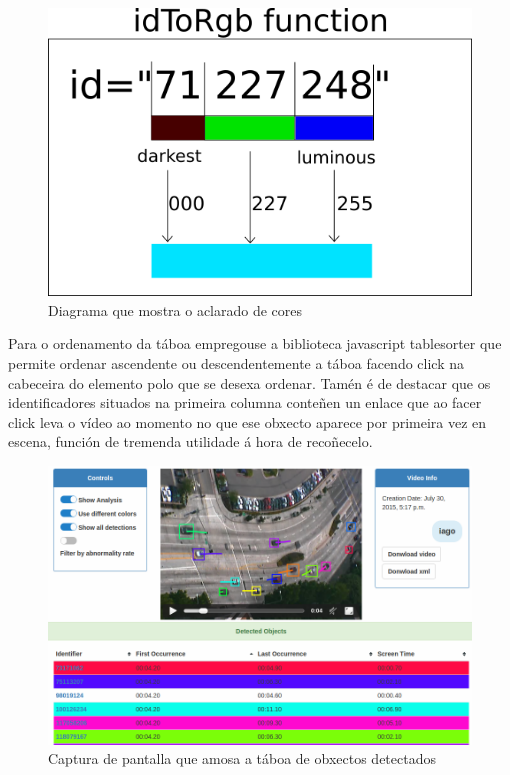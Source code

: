     \begin{figure}[htp]
    \begin{center}
        \includegraphics[scale=0.7]{figures/lightColor.png}
        \caption{Diagrama que mostra o aclarado de cores}
    \label{fig:lightColor}
    \end{center}
    \end{figure}

    Para o ordenamento da táboa empregouse a biblioteca javascript tablesorter que permite ordenar
    ascendente ou descendentemente a táboa facendo click na cabeceira do elemento polo que se desexa
    ordenar. Tamén é de destacar que os identificadores situados na primeira columna conteñen un 
    enlace que ao facer click leva o vídeo ao momento no que ese obxecto aparece por primeira vez en
    escena, función de tremenda utilidade á hora de recoñecelo.
    
    \begin{figure}[htp]
    \begin{center}
        \includegraphics[scale=0.4]{figures/DetectionsTable.png}
        \caption{Captura de pantalla que amosa a táboa de obxectos detectados}
    \label{fig:DetectionsTable}
    \end{center}
    \end{figure}
    
